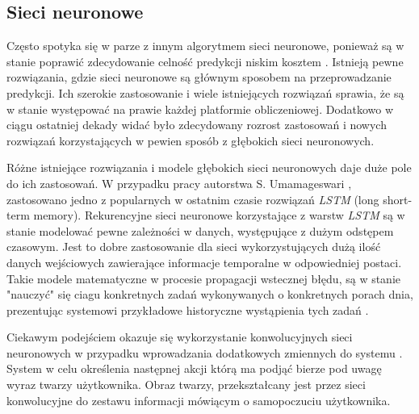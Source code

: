 

\subsection{Sieci neuronowe}


Często spotyka się w parze z innym algorytmem sieci neuronowe, ponieważ są w stanie poprawić zdecydowanie celność predykcji niskim kosztem \cite{episode_discovery_1}. Istnieją pewne rozwiązania, gdzie sieci neuronowe są głównym sposobem na przeprowadzanie predykcji. Ich szerokie zastosowanie i wiele istniejących rozwiązań sprawia, że są w stanie występować na prawie każdej platformie obliczeniowej. Dodatkowo w ciągu ostatniej dekady widać było zdecydowany rozrost zastosowań i nowych rozwiązań korzystających w pewien sposób z głębokich sieci neuronowych.

Różne istniejące rozwiązania i modele głębokich sieci neuronowych daje duże pole do ich zastosowań. W przypadku pracy autorstwa S. Umamageswari \cite{neural_1}, zastosowano jedno z popularnych w ostatnim czasie rozwiązań \textit{LSTM} (long short-term memory). Rekurencyjne sieci neuronowe korzystające z warstw \textit{LSTM} są w stanie modelować pewne zależności w danych, występujące z dużym odstępem czasowym. Jest to dobre zastosowanie dla sieci wykorzystujących dużą ilość danych wejściowych zawierające informacje temporalne w odpowiedniej postaci. Takie modele matematyczne w procesie propagacji wstecznej błędu, są w stanie "nauczyć" się ciagu konkretnych zadań wykonywanych o konkretnych porach dnia, prezentując systemowi przykładowe historyczne wystąpienia tych zadań \cite{ksiazka_tf}.

Ciekawym podejściem okazuje się wykorzystanie konwolucyjnych sieci neuronowych w przypadku wprowadzania dodatkowych zmiennych do systemu \cite{conv_1}. System w celu określenia następnej akcji którą ma podjąć bierze pod uwagę wyraz twarzy użytkownika. Obraz twarzy, przekształcany jest przez sieci konwolucyjne do zestawu informacji mówiącym o samopoczuciu użytkownika.

